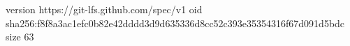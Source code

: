 version https://git-lfs.github.com/spec/v1
oid sha256:f8f8a3ac1efc0b82e42dddd3d9d635336d8cc52c393e35354316f67d091d5bdc
size 63
